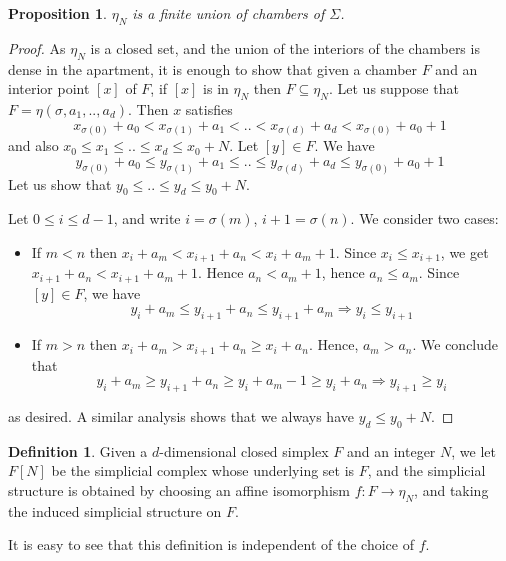 \documentclass{amsart}
\theoremstyle{theorem}
\theoremstyle{lemma}
\theoremstyle{prop}
\newtheorem{prop}[lemma]{Proposition}
\theoremstyle{definition}
\newtheorem{definition}[lemma]{Definition}
\theoremstyle{corollary}
\theoremstyle{remark}
\begin{document}
\begin{prop} 
$\eta_N$ is a finite union of chambers of $\Sigma$. 
\end{prop}
\begin{proof} As $\eta_N$ is a closed set, and the union of the interiors of the chambers is dense in the apartment, it is enough to show that given a chamber $F$ and an interior point $[x]$ of $F$, if $[x]$ is in $\eta_N$ then $F \subseteq \eta_N$. Let us suppose that $F = \eta(\sigma, a_1,..,a_d)$. Then $x$ satisfies $$x_{\sigma(0)}+a_0 < x_{\sigma(1)}+a_1 < .. < x_{\sigma(d)}+a_d < x_{\sigma(0)}+a_0 + 1$$ and also $x_0 \leq x_1 \leq .. \leq x_d \leq x_0+N$. Let $[y] \in F$. We have  $$y_{\sigma(0)}+a_0 \leq y_{\sigma(1)}+a_1 \leq .. \leq y_{\sigma(d)}+a_d \leq  y_{\sigma(0)}+a_0 + 1$$ Let us show that $y_0 \leq .. \leq y_d \leq y_0+N$.

Let $0 \leq i \leq d-1$, and write $i=\sigma(m)$, $i+1=\sigma(n)$. We consider two cases:
\begin{itemize}
\item
If $m<n$ then $x_i+a_m < x_{i+1}+a_n < x_i + a_m + 1$. Since $x_i \leq x_{i+1}$, we get $x_{i+1}+a_n < x_{i+1} + a_m + 1$. Hence $a_n < a_m+1$, hence $a_n \leq a_m$.
Since $[y] \in F$, we have $$y_i +a_m \leq y_{i+1} + a_n \leq y_{i+1} + a_m \Rightarrow y_i \leq y_{i+1}$$
\item
If $m>n$ then $x_i + a_m > x_{i+1}+a_n \geq x_i + a_n$. Hence, $a_m > a_n$. We conclude that
$$ y_i + a_m \geq y_{i+1}+a_n \geq y_i+a_m-1 \geq y_i+a_n \Rightarrow y_{i+1}\geq y_i $$
\end{itemize}
as desired. A similar analysis shows that we always have $y_d \leq y_0+ N$.
\end{proof}

\begin{definition} Given a $d$-dimensional closed simplex $F$ and an integer $N$, we let $F[N]$ be the simplicial complex whose underlying set is $F$, and the simplicial structure is obtained by choosing an affine isomorphism $f: F \rightarrow \eta_N$, and taking the induced simplicial structure on $F$. \end{definition}

It is easy to see that this definition is independent of the choice of $f$. 
\end{document}
